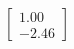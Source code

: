 \documentclass[preview]{standalone}
\begin{document}
\begin{align*}
\begin{bmatrix} 1.00 \\ -2.46 \end{bmatrix}
\end{align*}
\end{document}
